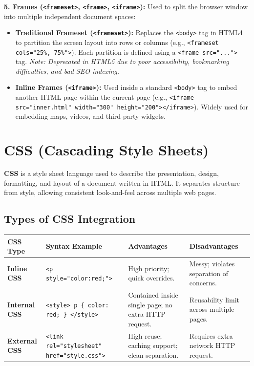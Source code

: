 \documentclass[12pt,a4paper]{article}
\renewcommand{\arraystretch}{1.45}
\begin{document}
\textbf{5. Frames (\texttt{<frameset>}, \texttt{<frame>}, \texttt{<iframe>}):} Used to split the browser window into multiple independent document spaces:
\begin{itemize}[leftmargin=*, itemsep=3pt]
  \item \textbf{Traditional Frameset (\texttt{<frameset>}):} Replaces the \texttt{<body>} tag in HTML4 to partition the screen layout into rows or columns (e.g., \texttt{<frameset cols="25\%, 75\%">}). Each partition is defined using a \texttt{<frame src="...">} tag. \textit{Note: Deprecated in HTML5 due to poor accessibility, bookmarking difficulties, and bad SEO indexing.}
  \item \textbf{Inline Frames (\texttt{<iframe>}):} Used inside a standard \texttt{<body>} tag to embed another HTML page within the current page (e.g., \texttt{<iframe src="inner.html" width="300" height="200"></iframe>}). Widely used for embedding maps, videos, and third-party widgets.
\end{itemize}

\section{CSS (Cascading Style Sheets)}

\begin{tcolorbox}[defbox, title={\textbf{CSS --- Cascading Style Sheets}}]
\textbf{CSS} is a style sheet language used to describe the presentation, design, formatting, and layout of a document written in HTML. It separates structure from style, allowing consistent look-and-feel across multiple web pages.
\end{tcolorbox}

\subsection{Types of CSS Integration}

\par\noindent
{\renewcommand{\arraystretch}{1.5}%
\begin{tabularx}{\linewidth}{|B{3.0cm}|Y|Y|Y|}
\hline
\textbf{CSS Type} & \textbf{Syntax Example} & \textbf{Advantages} & \textbf{Disadvantages} \\
\hline
\textbf{Inline CSS} & \texttt{<p style="color:red;">} & High priority; quick overrides. & Messy; violates separation of concerns. \\
\hline
\textbf{Internal CSS} & \texttt{<style> p \{ color: red; \} </style>} & Contained inside single page; no extra HTTP request. & Reusability limit across multiple pages. \\
\hline
\textbf{External CSS} & \texttt{<link rel="stylesheet" href="style.css">} & High reuse; caching support; clean separation. & Requires extra network HTTP request. \\
\hline
\end{tabularx}}
\end{document}
